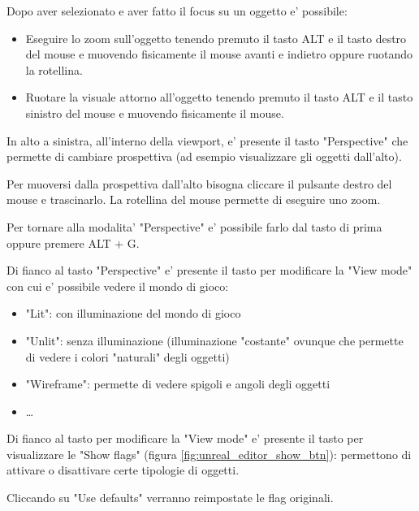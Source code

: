             Dopo aver selezionato e aver fatto il focus su un oggetto e' possibile:
            \begin{itemize}
                \item Eseguire lo zoom sull'oggetto tenendo premuto il tasto ALT e il tasto destro del mouse e muovendo fisicamente il mouse avanti e indietro oppure ruotando la rotellina.
                \item Ruotare la visuale attorno all'oggetto tenendo premuto il tasto ALT e il tasto sinistro del mouse e muovendo fisicamente il mouse.
            \end{itemize}

            In alto a sinistra, all'interno della viewport, e' presente il tasto "Perspective" \UEPerspectiveIcon che permette di cambiare prospettiva (ad esempio visualizzare gli oggetti dall'alto).

            \begin{notebox}
                Per muoversi dalla prospettiva dall'alto bisogna cliccare il pulsante destro del mouse e trascinarlo. La rotellina del mouse permette di eseguire uno zoom.
            \end{notebox}

            Per tornare alla modalita' "Perspective" e' possibile farlo dal tasto di prima oppure premere ALT + G.

            Di fianco al tasto "Perspective" e' presente il tasto per modificare la "View mode" \UEViewModeIcon con cui e' possibile vedere il mondo di gioco:
            \begin{itemize}
                \item "Lit": con illuminazione del mondo di gioco
                \item "Unlit": senza illuminazione (illuminazione "costante" ovunque che permette di vedere i colori "naturali" degli oggetti)
                \item "Wireframe": permette di vedere spigoli e angoli degli oggetti
                \item \dots
            \end{itemize}

            Di fianco al tasto per modificare la "View mode" e' presente il tasto per visualizzare le "Show flags" (figura \ref{fig:unreal_editor_show_btn}): permettono di attivare o disattivare certe tipologie di oggetti.

            \begin{notebox}
                Cliccando su "Use defaults" verranno reimpostate le flag originali.
            \end{notebox}

